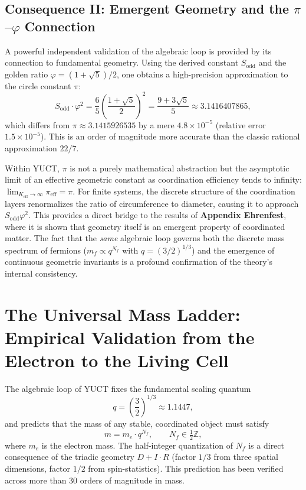 \documentclass[11pt,a4paper]{article}
\begin{document}
\subsection{Consequence II: Emergent Geometry and the \(\pi\)–\(\varphi\) Connection}
\label{subsec:consequence-geometry}

A powerful independent validation of the algebraic loop is provided by its connection to fundamental geometry. Using the derived constant \(S_{\mathrm{odd}}\) and the golden ratio \(\varphi = (1+\sqrt{5})/2\), one obtains a high-precision approximation to the circle constant \(\pi\):
\[
S_{\mathrm{odd}} \cdot \varphi^2 = \frac{6}{5} \left( \frac{1+\sqrt{5}}{2} \right)^2 = \frac{9+3\sqrt{5}}{5} \approx 3.1416407865,
\]
which differs from \(\pi \approx 3.1415926535\) by a mere \(4.8 \times 10^{-5}\) (relative error \(1.5 \times 10^{-5}\)). This is an order of magnitude more accurate than the classic rational approximation \(22/7\).

Within YUCT, \(\pi\) is not a purely mathematical abstraction but the asymptotic limit of an effective geometric constant as coordination efficiency tends to infinity: \(\lim_{K_{\mathrm{eff}} \to \infty} \pi_{\mathrm{eff}} = \pi\). For finite systems, the discrete structure of the coordination layers renormalizes the ratio of circumference to diameter, causing it to approach \(S_{\mathrm{odd}}\varphi^2\). This provides a direct bridge to the results of \textbf{Appendix Ehrenfest}, where it is shown that geometry itself is an emergent property of coordinated matter. The fact that the \emph{same} algebraic loop governs both the discrete mass spectrum of fermions (\(m_f \propto q^{N_f}\) with \(q = (3/2)^{1/3}\)) and the emergence of continuous geometric invariants is a profound confirmation of the theory's internal consistency.


\section{The Universal Mass Ladder: Empirical Validation from the Electron to the Living Cell}
\label{sec:mass_ladder}

The algebraic loop of YUCT fixes the fundamental scaling quantum
\begin{equation}
	q = \left(\frac{3}{2}\right)^{1/3} \approx 1.1447,
\end{equation}
and predicts that the mass of any stable, coordinated object must satisfy
\begin{equation}
	m = m_e \cdot q^{N_f}, \qquad N_f \in \tfrac{1}{2}\mathbb{Z},
\end{equation}
where $m_e$ is the electron mass. The half-integer quantization of $N_f$
is a direct consequence of the triadic geometry $D+I\cdot R$ (factor $1/3$
from three spatial dimensions, factor $1/2$ from spin-statistics). This
prediction has been verified across more than 30 orders of magnitude in mass.
\end{document}
